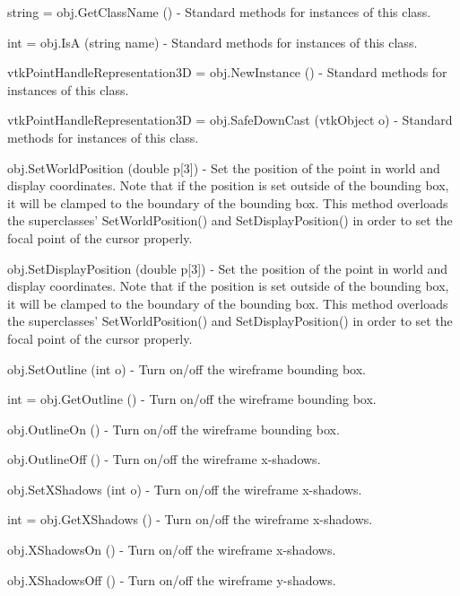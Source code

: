 \begin{DoxyItemize}
\item {\ttfamily string = obj.\-Get\-Class\-Name ()} -\/ Standard methods for instances of this class.  
\item {\ttfamily int = obj.\-Is\-A (string name)} -\/ Standard methods for instances of this class.  
\item {\ttfamily vtk\-Point\-Handle\-Representation3\-D = obj.\-New\-Instance ()} -\/ Standard methods for instances of this class.  
\item {\ttfamily vtk\-Point\-Handle\-Representation3\-D = obj.\-Safe\-Down\-Cast (vtk\-Object o)} -\/ Standard methods for instances of this class.  
\item {\ttfamily obj.\-Set\-World\-Position (double p\mbox{[}3\mbox{]})} -\/ Set the position of the point in world and display coordinates. Note that if the position is set outside of the bounding box, it will be clamped to the boundary of the bounding box. This method overloads the superclasses' Set\-World\-Position() and Set\-Display\-Position() in order to set the focal point of the cursor properly.  
\item {\ttfamily obj.\-Set\-Display\-Position (double p\mbox{[}3\mbox{]})} -\/ Set the position of the point in world and display coordinates. Note that if the position is set outside of the bounding box, it will be clamped to the boundary of the bounding box. This method overloads the superclasses' Set\-World\-Position() and Set\-Display\-Position() in order to set the focal point of the cursor properly.  
\item {\ttfamily obj.\-Set\-Outline (int o)} -\/ Turn on/off the wireframe bounding box.  
\item {\ttfamily int = obj.\-Get\-Outline ()} -\/ Turn on/off the wireframe bounding box.  
\item {\ttfamily obj.\-Outline\-On ()} -\/ Turn on/off the wireframe bounding box.  
\item {\ttfamily obj.\-Outline\-Off ()} -\/ Turn on/off the wireframe x-\/shadows.  
\item {\ttfamily obj.\-Set\-X\-Shadows (int o)} -\/ Turn on/off the wireframe x-\/shadows.  
\item {\ttfamily int = obj.\-Get\-X\-Shadows ()} -\/ Turn on/off the wireframe x-\/shadows.  
\item {\ttfamily obj.\-X\-Shadows\-On ()} -\/ Turn on/off the wireframe x-\/shadows.  
\item {\ttfamily obj.\-X\-Shadows\-Off ()} -\/ Turn on/off the wireframe y-\/shadows.  

\end{DoxyItemize}
